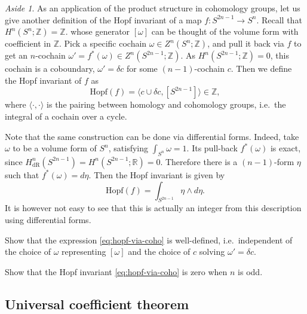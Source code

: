 \documentclass[12pt]{article}
\numberwithin{equation}{section}
\numberwithin{figure}{section}
\theoremstyle{remark}
\newtheorem{aside}[definition]{Aside}
\def\bR{\mathbb{R}}
\def\bZ{\mathbb{Z}}
\begin{document}
\begin{aside}
As an application of the product structure in cohomology groups,
let us give another definition of the Hopf invariant
of a map $f:S^{2n-1}\to S^n$.
Recall  that $H^n(S^n;\bZ)=\bZ$.
whose generator $[\omega]$ can be thought of the volume form with coefficient in $\bZ$.
Pick a specific cochain $\omega\in Z^n(S^n;\bZ)$,
and pull it back via $f$ to get an $n$-cochain $\omega'= f^*(\omega)\in Z^n(S^{2n-1};\bZ)$.
As $H^n(S^{2n-1};\bZ)=0$, this cochain is a coboundary, $\omega'=\delta c$ for some $(n-1)$-cochain $c$.
Then we define the Hopf invariant of $f$ as \begin{equation}
  \text{Hopf}(f) = \langle c\cup \delta c,[S^{2n-1}]   \rangle \in \bZ,\label{eq:hopf-via-coho}
\end{equation}
where $\langle \cdot,\cdot\rangle$ is the pairing between homology and cohomology groups, i.e.~the integral of a cochain over a cycle.

Note that the same construction can be done via differential forms.
Indeed, take $\omega$ to be a volume form of $S^n$, satisfying $\int_{S^n}\omega=1$.
Its pull-back $f^*(\omega)$ is exact, since $H^n_\text{dR}(S^{2n-1})=H^n(S^{2n-1};\bR)=0$.
Therefore there is a $(n-1)$-form $\eta$ such that $f^*(\omega)=d\eta$.
Then the Hopf invariant is given by \begin{equation}
  \text{Hopf}(f) = \int_{S^{2n-1}} \eta\wedge d\eta.
\end{equation}
It is however not easy to see that this is actually an integer
from this description using differential forms.
\end{aside}

\begin{question}
  Show that the expression \eqref{eq:hopf-via-coho} is well-defined, i.e.~independent of the choice of $\omega$
  representing $[\omega]$ and the choice of $c$ solving $\omega'=\delta c$.
\end{question}
\begin{question}
  Show that the Hopf invariant \eqref{eq:hopf-via-coho} is zero when $n$ is odd.
\end{question}

\subsection{Universal coefficient theorem}
\end{document}
